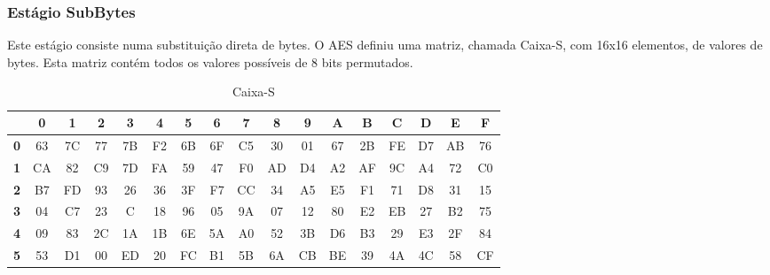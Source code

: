 	\subsubsection{Estágio SubBytes}
Este estágio consiste numa substituição direta de bytes. O AES definiu uma matriz, chamada Caixa-S, com 16x16 elementos, de valores de bytes. Esta matriz contém todos os valores possíveis de 8 bits permutados.\par
\begin{table}[tbh]
	\centering
	\caption{Caixa-S}
	\label{tab2}
	\begin{tabular}{c|c|c|c|c|c|c|c|c|c|c|c|c|c|c|c|c|}
		\cline{2-17}
		& \textbf{0} & \textbf{1} & \textbf{2} & \textbf{3} & \textbf{4} & \textbf{5} & \textbf{6} & \textbf{7} & \textbf{8} & \textbf{9} & \textbf{A} & \textbf{B} & \textbf{C} & \textbf{D} & \textbf{E} & \textbf{F} \\ \hline
		\multicolumn{1}{|c|}{\textbf{0}} & 63         & 7C         & 77         & 7B         & F2         & 6B         & 6F         & C5         & 30         & 01         & 67         & 2B         & FE         & D7         & AB         & 76         \\ \hline
		\multicolumn{1}{|c|}{\textbf{1}} & CA         & 82         & C9         & 7D         & FA         & 59         & 47         & F0         & AD         & D4         & A2         & AF         & 9C         & A4         & 72         & C0         \\ \hline
		\multicolumn{1}{|c|}{\textbf{2}} & B7         & FD         & 93         & 26         & 36         & 3F         & F7         & CC         & 34         & A5         & E5         & F1         & 71         & D8         & 31         & 15         \\ \hline
		\multicolumn{1}{|c|}{\textbf{3}} & 04         & C7         & 23         & C          & 18         & 96         & 05         & 9A         & 07         & 12         & 80         & E2         & EB         & 27         & B2         & 75         \\ \hline
		\multicolumn{1}{|c|}{\textbf{4}} & 09         & 83         & 2C         & 1A         & 1B         & 6E         & 5A         & A0         & 52         & 3B         & D6         & B3         & 29         & E3         & 2F         & 84         \\ \hline
		\multicolumn{1}{|c|}{\textbf{5}} & 53         & D1         & 00         & ED         & 20         & FC         & B1         & 5B         & 6A         & CB         & BE         & 39         & 4A         & 4C         & 58         & CF         \\ \hline

\end{tabular}
\end{table}
